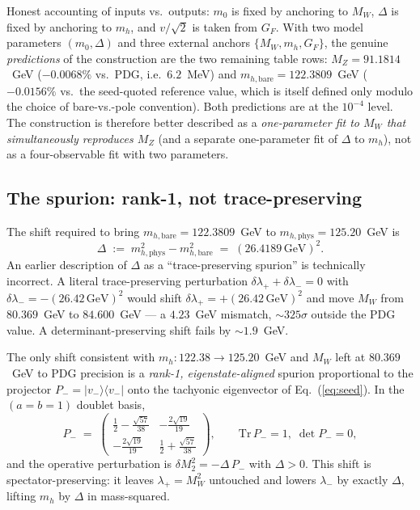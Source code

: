 \documentclass[%
 aps,
 prd,
 reprint,
 nofootinbib,
 superscriptaddress,
 amsmath,
 amssymb,
]{revtex4-2}
\begin{document}
Honest accounting of inputs vs.\ outputs: $m_0$ is fixed by anchoring to $M_W$, $\Delta$ is fixed by anchoring to $m_h$, and $v/\sqrt{2}$ is taken from $G_F$. With two model parameters $(m_0,\Delta)$ and three external anchors $\{M_W,m_h,G_F\}$, the genuine \emph{predictions} of the construction are the two remaining table rows: $M_Z=91.1814$~GeV ($-0.0068\%$ vs.\ PDG, i.e.\ $6.2$~MeV) and $m_{h,\mathrm{bare}}=122.3809$~GeV ($-0.0156\%$ vs.\ the seed-quoted reference value, which is itself defined only modulo the choice of bare-vs.-pole convention). Both predictions are at the $10^{-4}$ level. The construction is therefore better described as a \emph{one-parameter fit to $M_W$ that simultaneously reproduces $M_Z$} (and a separate one-parameter fit of $\Delta$ to $m_h$), not as a four-observable fit with two parameters.

\subsection{The spurion: rank-1, not trace-preserving}\label{sec:spurion}

The shift required to bring $m_{h,\mathrm{bare}}=122.3809$~GeV to $m_{h,\mathrm{phys}}=125.20$~GeV is
\begin{equation}\label{eq:Delta}
\Delta \;:=\; m_{h,\mathrm{phys}}^2 - m_{h,\mathrm{bare}}^2 \;=\; (26.4189\,\mathrm{GeV})^2.
\end{equation}
An earlier description of $\Delta$ as a ``trace-preserving spurion'' is technically incorrect. A literal trace-preserving perturbation $\delta\lambda_+ + \delta\lambda_-=0$ with $\delta\lambda_-=-(26.42\,\mathrm{GeV})^2$ would shift $\delta\lambda_+=+(26.42\,\mathrm{GeV})^2$ and move $M_W$ from $80.369$~GeV to $84.600$~GeV --- a $4.23$~GeV mismatch, $\sim 325\sigma$ outside the PDG value. A determinant-preserving shift fails by $\sim 1.9$~GeV.

The only shift consistent with $m_h\!:\!122.38\to 125.20$~GeV and $M_W$ left at $80.369$~GeV to PDG precision is a \emph{rank-1, eigenstate-aligned} spurion proportional to the projector $P_-=|v_-\rangle\langle v_-|$ onto the tachyonic eigenvector of Eq.~(\ref{eq:seed}). In the $(a=b=1)$ doublet basis,
\begin{equation}\label{eq:P}
P_- \;=\; \begin{pmatrix} \tfrac{1}{2}-\tfrac{\sqrt{57}}{38} & -\tfrac{2\sqrt{19}}{19} \\ -\tfrac{2\sqrt{19}}{19} & \tfrac{1}{2}+\tfrac{\sqrt{57}}{38}\end{pmatrix},\qquad \mathrm{Tr}\,P_-=1,\;\det P_-=0,
\end{equation}
and the operative perturbation is $\delta M_2^2 = -\Delta\,P_-$ with $\Delta>0$. This shift is spectator-preserving: it leaves $\lambda_+=M_W^2$ untouched and lowers $\lambda_-$ by exactly $\Delta$, lifting $m_h$ by $\Delta$ in mass-squared.
\end{document}
